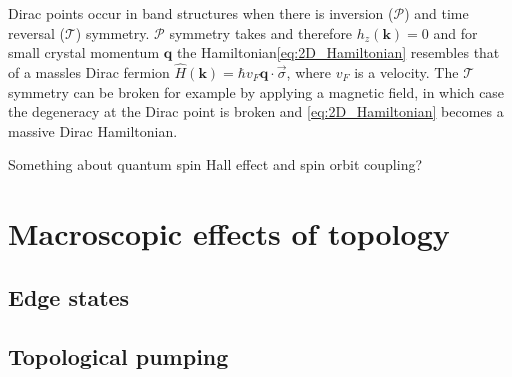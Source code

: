 Dirac points occur in band structures when there is inversion ($\mathcal{P}$) and time reversal ($\mathcal{T}$) symmetry.  $\mathcal{P}$ symmetry takes and therefore $h_z(\mathbf{k})=0$ and for small crystal momentum $\mathbf{q}$ the Hamiltonian\ref{eq:2D_Hamiltonian} resembles that of a massles Dirac fermion $\hat H(\mathbf k)=\hbar v_F\mathbf q\cdot \vec \sigma$, where $v_F$ is a velocity. The $\mathcal{T}$ symmetry can be broken for example by applying a magnetic field, in which case the degeneracy at the Dirac point is broken and \ref{eq:2D_Hamiltonian} becomes a massive Dirac Hamiltonian. 

Something about quantum spin Hall effect and spin orbit coupling?

\section{Macroscopic effects of topology}
\subsection{Edge states}
\subsection{Topological pumping}







